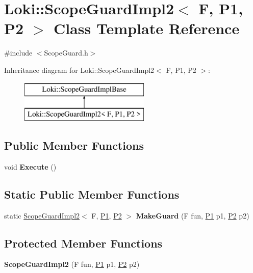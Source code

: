 \hypertarget{classLoki_1_1ScopeGuardImpl2}{}\section{Loki\+:\+:Scope\+Guard\+Impl2$<$ F, P1, P2 $>$ Class Template Reference}
\label{classLoki_1_1ScopeGuardImpl2}


{\ttfamily \#include $<$Scope\+Guard.\+h$>$}

Inheritance diagram for Loki\+:\+:Scope\+Guard\+Impl2$<$ F, P1, P2 $>$\+:\begin{figure}[H]
\begin{center}
\leavevmode
\includegraphics[height=2.000000cm]{classLoki_1_1ScopeGuardImpl2}
\end{center}
\end{figure}
\subsection*{Public Member Functions}
\begin{DoxyCompactItemize}
\item 
\hypertarget{classLoki_1_1ScopeGuardImpl2_aa8cba52e88c2194d21202c5462f23f0f}{}void {\bfseries Execute} ()\label{classLoki_1_1ScopeGuardImpl2_aa8cba52e88c2194d21202c5462f23f0f}

\end{DoxyCompactItemize}
\subsection*{Static Public Member Functions}
\begin{DoxyCompactItemize}
\item 
\hypertarget{classLoki_1_1ScopeGuardImpl2_ac7da6b06a2fa101da07408dcf9e89966}{}static \hyperlink{classLoki_1_1ScopeGuardImpl2}{Scope\+Guard\+Impl2}$<$ F, \hyperlink{structP1}{P1}, \hyperlink{structP2}{P2} $>$ {\bfseries Make\+Guard} (F fun, \hyperlink{structP1}{P1} p1, \hyperlink{structP2}{P2} p2)\label{classLoki_1_1ScopeGuardImpl2_ac7da6b06a2fa101da07408dcf9e89966}

\end{DoxyCompactItemize}
\subsection*{Protected Member Functions}
\begin{DoxyCompactItemize}
\item 
\hypertarget{classLoki_1_1ScopeGuardImpl2_a945466dc41a5a26f077ba4b2ef470d0b}{}{\bfseries Scope\+Guard\+Impl2} (F fun, \hyperlink{structP1}{P1} p1, \hyperlink{structP2}{P2} p2)\label{classLoki_1_1ScopeGuardImpl2_a945466dc41a5a26f077ba4b2ef470d0b}

\end{DoxyCompactItemize}
